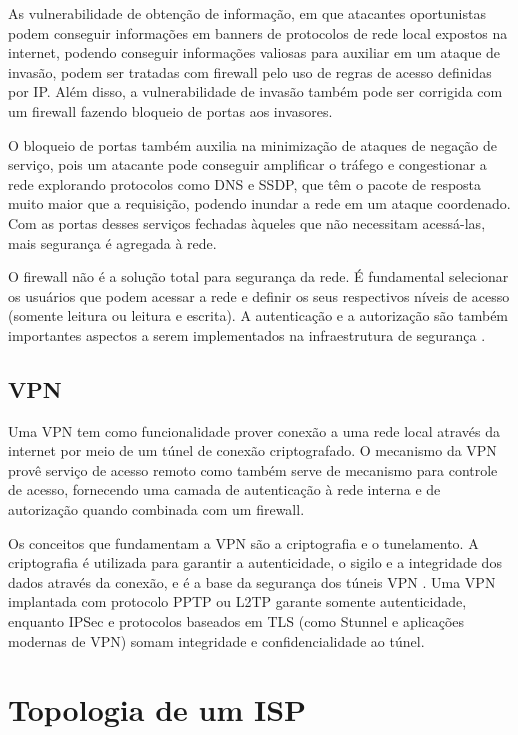     As vulnerabilidade de obtenção de informação, em que atacantes oportunistas podem conseguir informações em banners de protocolos de rede local expostos na internet, podendo conseguir informações valiosas para auxiliar em um ataque de invasão, podem ser tratadas com firewall pelo uso de regras de acesso definidas por IP. Além disso, a vulnerabilidade de invasão também pode ser corrigida com um firewall fazendo bloqueio de portas aos invasores. 

    O bloqueio de portas também auxilia na minimização de ataques de negação de serviço, pois um atacante pode conseguir amplificar o tráfego e congestionar a rede explorando protocolos como DNS e SSDP, que têm o pacote de resposta muito maior que a requisição, podendo inundar a rede em um ataque coordenado. Com as portas desses serviços fechadas àqueles que não necessitam acessá-las, mais segurança é agregada à rede.
    
    O firewall não é a solução total para segurança da rede. É fundamental selecionar os usuários que podem acessar a rede e definir os seus respectivos níveis de acesso (somente leitura ou leitura e escrita). A autenticação e a autorização são também importantes aspectos a serem implementados na infraestrutura de segurança \cite{nakamura2007}.

\subsection{VPN}

    Uma VPN tem como funcionalidade prover conexão a uma rede local através da internet por meio de um túnel de conexão criptografado. O mecanismo da VPN provê serviço de acesso remoto como também serve de mecanismo para controle de acesso, fornecendo uma camada de autenticação à rede interna e de autorização quando combinada com um firewall.
    
    Os conceitos que fundamentam a VPN são a criptografia e o tunelamento. A criptografia é utilizada para garantir a autenticidade, o sigilo e a integridade dos dados através da conexão, e é a base da segurança dos túneis VPN \cite{nakamura2007}. Uma VPN implantada com protocolo PPTP ou L2TP garante somente autenticidade, enquanto IPSec e protocolos baseados em TLS (como Stunnel e aplicações modernas de VPN) somam integridade e confidencialidade ao túnel.

\section{Topologia de um ISP}

